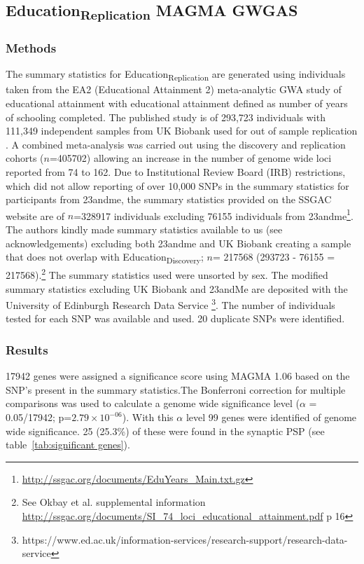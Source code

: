 \subsection{Education\textsubscript{Replication}  MAGMA GWGAS}
\label{sec:Edcuation replication gwgas}
\subsubsection{Methods}

The summary statistics for Education\textsubscript{Replication} are generated using individuals taken from the EA2 (Educational Attainment 2) meta-analytic GWA study of educational attainment\cite{okbay2016genome} with educational attainment defined as number of years of schooling completed.  The published study is of 293,723 individuals with 111,349 independent samples from UK Biobank used for out of sample replication \cite{sudlow2015uk}. A combined meta-analysis was carried out using the discovery and replication cohorts ($n$=405702) allowing an increase in the number of genome wide loci reported from 74 to 162. Due to Institutional Review Board (IRB) restrictions, which did not allow reporting of over 10,000 SNPs in the summary statistics for participants from 23andme, the summary statistics provided on the SSGAC website are of $n$=328917 individuals excluding 76155 individuals from 23andme\footnote{\url{http://ssgac.org/documents/EduYears_Main.txt.gz}}. The authors kindly made summary statistics available to us (see acknowledgements) excluding both 23andme and UK Biobank creating a sample that does not overlap with Education\textsubscript{Discovery}; $n$= 217568 (293723 - 76155 = 217568)\cite{okbay2016genome}.\footnote{See Okbay et al. supplemental information \url{http://ssgac.org/documents/SI_74_loci_educational_attainment.pdf} p 16} The summary statistics used were unsorted by sex. The modified summary statistics excluding UK Biobank and 23andMe  are deposited with the University of Edinburgh Research Data Service \footnote{https://www.ed.ac.uk/information-services/research-support/research-data-service}.
The number of individuals tested for each SNP was available and used. 20 duplicate SNPs were identified. 

\subsubsection{Results}



17942 genes were assigned a significance score using MAGMA 1.06 based on the SNP's present in the summary statistics.The Bonferroni correction for multiple comparisons was used to calculate a genome wide significance level ($\alpha$ = 0.05/17942; p=$2.79 \times 10^{-06}$). With this $\alpha$ level 99 genes were identified of genome wide significance. 25 (25.3\%) of these were found in the synaptic PSP (see table~\ref{tab:significant genes}).

